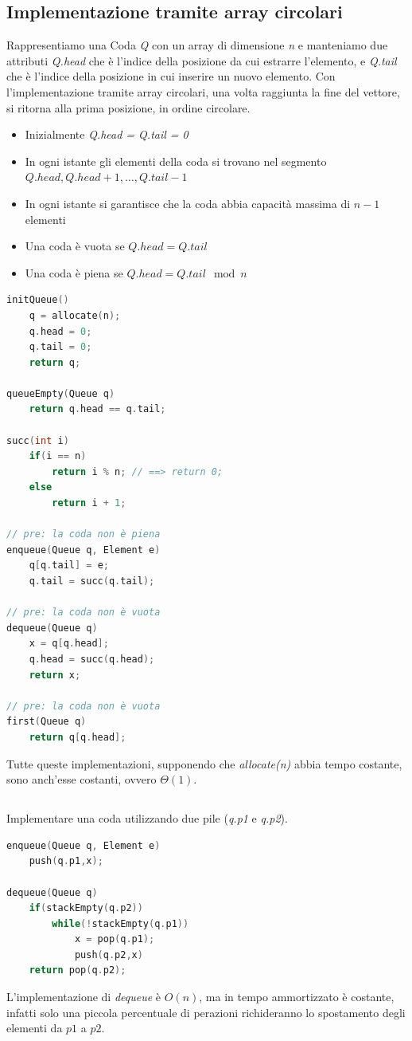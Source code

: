 \documentclass[italian]{article}
\newcommand{\varOmicron}{O}
\newcommand{\exercize}{\text{\faPencil $\;$ Esercizio }}
\begin{document}
\subsection{Implementazione tramite array circolari}
Rappresentiamo una Coda \textit{Q} con un array di dimensione \textit{n} e manteniamo due attributi \textit{Q.head} che è l'indice della posizione da cui estrarre l'elemento, e \textit{Q.tail} che è l'indice della posizione in cui inserire un nuovo elemento. Con l'implementazione tramite array circolari, una volta raggiunta la fine del vettore, si ritorna alla prima posizione, in ordine circolare.
\begin{itemize}[itemsep=0pt]
	\item Inizialmente \textit{Q.head = Q.tail = 0}
	\item In ogni istante gli elementi della coda si trovano nel segmento $Q.head, Q.head + 1, \dots, Q.tail - 1$
	\item In ogni istante si garantisce che la coda abbia capacità massima di $n-1$ elementi
	\item Una coda è vuota se $Q.head = Q.tail$
	\item Una coda è piena se $Q.head = Q.tail \mod n$
\end{itemize}
\begin{lstlisting}[language=c,mathescape=true]
initQueue()
	q = allocate(n);
	q.head = 0;
	q.tail = 0;
	return q;
	
queueEmpty(Queue q)
	return q.head == q.tail;
	
succ(int i)
	if(i == n)
		return i % n; // ==> return 0;
	else
		return i + 1;
	
// pre: la coda non è piena
enqueue(Queue q, Element e)
	q[q.tail] = e;
	q.tail = succ(q.tail);
	
// pre: la coda non è vuota
dequeue(Queue q)
	x = q[q.head];
	q.head = succ(q.head);
	return x;
	
// pre: la coda non è vuota
first(Queue q)
	return q[q.head];
\end{lstlisting}
Tutte queste implementazioni, supponendo che \textit{allocate(n)} abbia tempo costante, sono anch'esse costanti, ovvero $\varTheta(1)$.

\pagebreak

\subsection{\exercize}
Implementare una coda utilizzando due pile (\textit{q.p1} e \textit{q.p2}).
\begin{lstlisting}[language=c,mathescape=true]
enqueue(Queue q, Element e)
	push(q.p1,x);
	
dequeue(Queue q)
	if(stackEmpty(q.p2))
		while(!stackEmpty(q.p1))
			x = pop(q.p1);
			push(q.p2,x)
	return pop(q.p2);
\end{lstlisting}
L'implementazione di \textit{dequeue} è $\varOmicron(n)$, ma in tempo ammortizzato è costante, infatti solo una piccola percentuale di perazioni richideranno lo spostamento degli elementi da $p1$ a $p2$.
\end{document}
